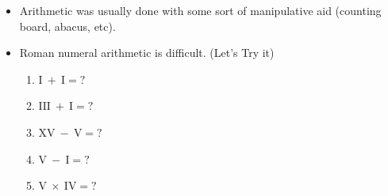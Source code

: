 \documentclass{beamer}
\begin{document}
\begin{frame}
\begin{itemize}[<+(1)->]
    \item Arithmetic was usually done with some sort of manipulative aid (counting board, abacus, etc).
    \item Roman numeral arithmetic is difficult. (Let's Try it)
    \begin{enumerate}
        \item $\mathrm{I}\ +\ \mathrm{I}=?$
        \item $\mathrm{III}\ +\ \mathrm{I}=?$
        \item $\mathrm{XV}\ -\ \mathrm{V}=?$
        \item $\mathrm{V}\ -\ \mathrm{I}=?$
        \item $\mathrm{V}\ \times\ \mathrm{IV}=?$
    \end{enumerate}
\end{itemize}
\end{frame}
\end{document}
